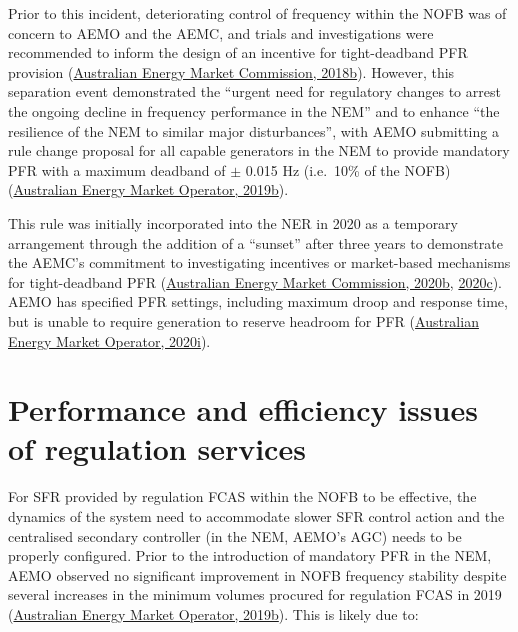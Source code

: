 \documentclass[12pt,a4paper,]{report}
\begin{document}
Prior to this incident, deteriorating control of frequency within the
NOFB was of concern to AEMO and the AEMC, and trials and investigations
were recommended to inform the design of an incentive for tight-deadband
PFR provision
(\protect\hyperlink{ref-australianenergymarketcommissionFrequencyControlFrameworks2018}{Australian
Energy Market Commission, 2018b}). However, this separation event
demonstrated the ``urgent need for regulatory changes to arrest the
ongoing decline in frequency performance in the NEM'' and to enhance
``the resilience of the NEM to similar major disturbances'', with AEMO
submitting a rule change proposal for all capable generators in the NEM
to provide mandatory PFR with a maximum deadband of \(\pm\) 0.015 Hz
(i.e.~10\% of the NOFB)
(\protect\hyperlink{ref-australianenergymarketoperatorElectricityRuleChange2019}{Australian
Energy Market Operator, 2019b}).

This rule was initially incorporated into the NER in 2020 as a temporary
arrangement through the addition of a ``sunset'' after three years to
demonstrate the AEMC's commitment to investigating incentives or
market-based mechanisms for tight-deadband PFR
(\protect\hyperlink{ref-australianenergymarketcommissionMandatoryPrimaryFrequency2020}{Australian
Energy Market Commission, 2020b},
\protect\hyperlink{ref-australianenergymarketcommissionFrequencyControlRule2020}{2020c}).
AEMO has specified PFR settings, including maximum droop and response
time, but is unable to require generation to reserve headroom for PFR
(\protect\hyperlink{ref-australianenergymarketoperatorInterimPrimaryFrequency2020}{Australian
Energy Market Operator, 2020i}).

\hypertarget{sec:fcs-regulation}{%
\section{Performance and efficiency issues of regulation
services}\label{sec:fcs-regulation}}

For SFR provided by regulation FCAS within the NOFB to be effective, the
dynamics of the system need to accommodate slower SFR control action and
the centralised secondary controller (in the NEM, AEMO's AGC) needs to
be properly configured. Prior to the introduction of mandatory PFR in
the NEM, AEMO observed no significant improvement in NOFB frequency
stability despite several increases in the minimum volumes procured for
regulation FCAS in 2019
(\protect\hyperlink{ref-australianenergymarketoperatorElectricityRuleChange2019}{Australian
Energy Market Operator, 2019b}). This is likely due to:
\end{document}
